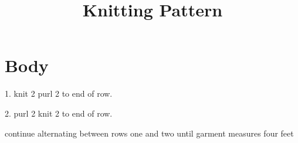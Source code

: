 \documentclass[10pt]{article}
\title{Knitting Pattern}
\date{}
\begin{document}
\maketitle

\section*{Body}

1. knit 2 purl 2 to end of row.

2. purl 2 knit 2 to end of row.

continue alternating between rows one and two until garment measures four feet
\end{document}
